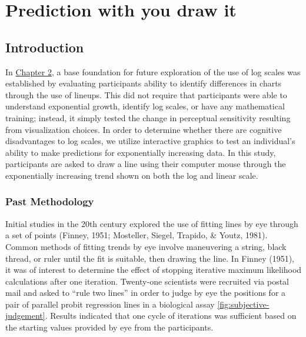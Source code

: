 \documentclass[print]{nuthesis}
\begin{document}
\hypertarget{youdrawit}{%
\chapter{Prediction with you draw it}\label{youdrawit}}

\hypertarget{introduction-1}{%
\section{Introduction}\label{introduction-1}}

In \protect\hyperlink{lineups}{Chapter 2}, a base foundation for future exploration of the use of log scales was established by evaluating participants ability to identify differences in charts through the use of lineups.
This did not require that participants were able to understand exponential growth, identify log scales, or have any mathematical training; instead, it simply tested the change in perceptual sensitivity resulting from visualization choices.
In order to determine whether there are cognitive disadvantages to log scales, we utilize interactive graphics to test an individual's ability to make predictions for exponentially increasing data. In this study, participants are asked to draw a line using their computer mouse through the exponentially increasing trend shown on both the log and linear scale.

\hypertarget{past-methodology}{%
\subsection{Past Methodology}\label{past-methodology}}

Initial studies in the 20th century explored the use of fitting lines by eye through a set of points (Finney, 1951; Mosteller, Siegel, Trapido, \& Youtz, 1981).
Common methods of fitting trends by eye involve maneuvering a string, black thread, or ruler until the fit is suitable, then drawing the line.
In Finney (1951), it was of interest to determine the effect of stopping iterative maximum likelihood calculations after one iteration. Twenty-one scientists were recruited via postal mail and asked to ``rule two lines'' in order to judge by eye the positions for a pair of parallel probit regression lines in a biological assay \cref{fig:subjective-judgement}.
Results indicated that one cycle of iterations was sufficient based on the starting values provided by eye from the participants.
\end{document}
